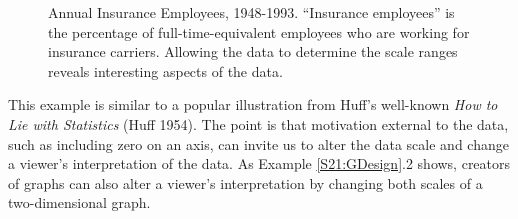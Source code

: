 \begin{figure}[htp]
  \begin{center}  \hfill
    \caption{\label{F21:InsurEmploy} \small Annual Insurance Employees, 1948-1993. ``Insurance employees'' is
the percentage of full-time-equivalent employees who are working for
insurance carriers. Allowing the data to determine the scale ranges
reveals interesting aspects of the data.}
  \end{center}
\end{figure}

This example is similar to a popular illustration from Huff's
well-known \emph{How to Lie with Statistics} (Huff 1954). The point
is that motivation external to the data, such as including zero on
an axis, can invite us to alter the data scale and change a viewer's
interpretation of the data. As Example \ref{S21:GDesign}.2 shows,
creators of graphs can also alter a viewer's interpretation by
changing both scales of a two-dimensional graph.


